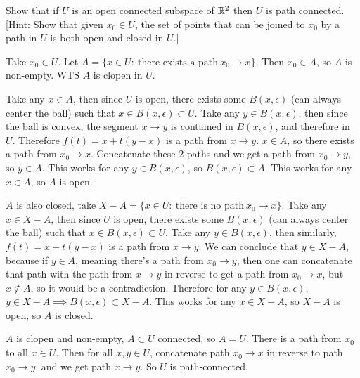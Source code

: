 \documentclass[a4paper, 12pt]{article}
\begin{document}
\begin{problem} 
    Show that if $U$ is an open connected subspace of $\mathbb{R}^2$ then $U$ is path connected. [Hint: Show that given $x_0 \in U$, the set of points that can be joined to $x_0$ by a path in $U$ is both open and closed in $U$.]
\end{problem}
\begin{solution}
    Take $x_0 \in U$. Let $A = \{x \in U: \:\text{there exists a path}\: x_0 \to x\}$. Then $x_0 \in A$, so $A$ is non-empty. WTS $A$ is clopen in $U$.

    Take any $x \in A$, then since $U$ is open, there exists some $B(x, \epsilon)$ (can always center the ball) such that $x \in B(x, \epsilon) \subset U$. Take any $y \in B(x, \epsilon)$, then since the ball is convex, the segment $x \to y$ is contained in $B(x, \epsilon)$, and therefore in $U$. Therefore $f(t) = x + t(y-x)$ is a path from $x \to y$. $x \in A$, so there exists a path from $x_0 \to x$. Concatenate these 2 paths and we get a path from $x_0 \to y$, so $y \in A$. This works for any $y \in B(x, \epsilon)$, so $B(x, \epsilon) \subset A$. This works for any $x \in A$, so $A$ is open.

    $A$ is also closed, take $X - A = \{x \in U: \:\text{there is no path}\: x_0 \to x\}$. Take any $x \in X - A$, then since $U$ is open, there exists some $B(x, \epsilon)$ (can always center the ball) such that $x \in B(x, \epsilon) \subset U$. Take any $y \in B(x, \epsilon)$, then similarly, $f(t) = x + t(y-x)$ is a path from $x \to y$. We can conclude that $y \in X -A$, because if $y \in A$, meaning there's a path from $x_0 \to y$, then one can concatenate that path with the path from $x \to y$ in reverse to get a path from $x_0 \to x$, but $x \not \in A$, so it would be a contradiction. Therefore for any $y \in B(x, \epsilon)$, $y \in X - A \implies B(x, \epsilon) \subset X - A$. This works for any $x \in X - A$, so $X - A$ is open, so $A$ is closed.

    $A$ is clopen and non-empty, $A \subset U$ connected, so $A = U$. There is a path from $x_0$ to all $x \in U$. Then for all $x, y \in U$, concatenate path $x_0\to x$ in reverse to path $x_0\to y$, and we get path $x \to y$. So $U$ is path-connected.
\end{solution}
\end{document}
